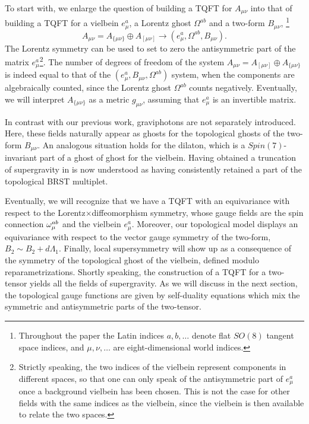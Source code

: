 \documentclass[a4paper,12pt]{article}
\begin{document}
To start with, we enlarge the question of building a TQFT for 
$A_{\mu\nu}$ into that of building a TQFT for a vielbein $e^a_\mu$,  a Lorentz
ghost $\Omega^{ab} $ and  a two-form   $B_{\mu\nu}$,%
\footnote{Throughout the paper the Latin indices
$a,b,\ldots$ denote flat $SO(8)$ tangent space indices, and
$\mu,\nu,\ldots$ are eight-dimensional world indices.}
$$A_{\mu\nu}= A_{\{\mu\nu\}} \oplus  A_{[\mu\nu]} \to (e^a_\mu,
\Omega^{ab},B_{\mu\nu}). $$
The Lorentz symmetry can be used to set to zero the
antisymmetric part of the matrix $e^a_\mu$\footnote{Strictly speaking,
the two indices of the vielbein represent components in different spaces,
so that one can only speak of the antisymmetric part of $e_\mu^a$ once a
background vielbein has been chosen. This is not the case for other fields
with the same indices as the vielbein, since the vielbein is then available
to relate the two spaces.}.
The number of degrees of freedom of the system 
$A_{\mu\nu}=A_{[\mu\nu]} \oplus A_{\{\mu\nu\}}$  is indeed
equal to that of the $(e^a_\mu, B_{\mu\nu} ,\Omega^{ab})$
system, when the components are
algebraically counted, since the Lorentz ghost $\Omega^{ab}$ counts
negatively. Eventually, we will interpret 
$A_{\{\mu\nu\}}$ as a metric $g_{\mu\nu}$,
assuming that $e^a_\mu$ is an invertible matrix.

In contrast with our previous work, graviphotons   are not separately
introduced. Here, these fields   naturally appear  as ghosts for the
topological ghosts of the two-form $B_{\mu\nu}$. An analogous situation
holds for the dilaton, which is a $Spin(7)$-invariant part of a ghost
of ghost for the vielbein. Having obtained a truncation of supergravity
in \cite{BT2} is now understood  as having  consistently retained a
part of the topological BRST multiplet.

Eventually, we will recognize that we have a TQFT with an equivariance
with respect  to the Lorentz$\times$diffeomorphism symmetry, whose
gauge fields are the spin connection $\omega^{ab}_\mu$ and the vielbein
$e^a_\mu$.  Moreover, our topological model displays an equivariance
with respect to the vector gauge symmetry of the two-form, $B_2\sim B_2
+ d\Lambda_1$.  Finally, local supersymmetry will show up  as a
consequence of the symmetry of the topological ghost of the  vielbein,
defined modulo reparametrizations.  Shortly speaking, the construction
of a TQFT for a two-tensor yields all the  fields of supergravity. As
we will discuss in the next section, the topological gauge functions
are given by self-duality equations which mix the symmetric and
antisymmetric parts of the two-tensor.
\end{document}

